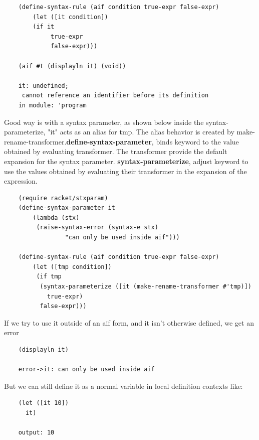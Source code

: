 \begin{lstlisting}
	(define-syntax-rule (aif condition true-expr false-expr)
    	(let ([it condition])
      	(if it
         	 true-expr
         	 false-expr)))

 	(aif #t (displayln it) (void))

	it: undefined;
	 cannot reference an identifier before its definition
  	in module: 'program
\end{lstlisting}

Good way is with a syntax parameter, as shown below inside the syntax-parameterize, "it" acts as an alias for tmp. The alias behavior is created by make-rename-transformer.\textbf{define-syntax-parameter}, binds keyword to the value obtained by evaluating transformer. The transformer provide the default expansion for the syntax parameter.
\textbf{syntax-parameterize}, adjust keyword to use the values obtained by evaluating their transformer in the expansion of the expression. 


\begin{lstlisting}
	(require racket/stxparam)
	(define-syntax-parameter it
    	(lambda (stx)
     	 (raise-syntax-error (syntax-e stx)
     	 		 "can only be used inside aif")))

 	(define-syntax-rule (aif condition true-expr false-expr)
    	(let ([tmp condition])
     	 (if tmp
          (syntax-parameterize ([it (make-rename-transformer #'tmp)])
            true-expr)
          false-expr)))
\end{lstlisting}

If we try to use it outside of an aif form, and it isn’t otherwise defined, we get an error 
\begin{lstlisting}
	(displayln it)

	error->it: can only be used inside aif
\end{lstlisting}

But we can still define it as a normal variable in local definition contexts like:
\begin{lstlisting}
	(let ([it 10])
  	  it)

	output: 10
\end{lstlisting}